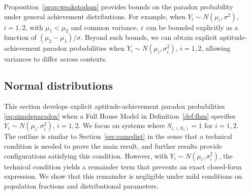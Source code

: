 \documentclass[12pt]{article}
\begin{document}
Proposition~\ref{prop:weakstodom} provides bounds on the paradox probability under general achievement distributions. For example, when $Y_i \sim N(\mu_i, \sigma^2)$, $i = 1,2$, with $\mu_1 < \mu_2$ and common variance, $\varepsilon$ can be bounded explicitly as a function of $(\mu_2 - \mu_1)/\sigma$. Beyond such bounds, we can obtain explicit aptitude-achievement paradox probabilities when $Y_i \sim N(\mu_i,\sigma_i^2)$, $i = 1,2$, allowing variances to differ across contexts.


\subsection{Normal distributions}
\label{subsec:normal}


This section develops explicit aptitude-achievement paradox probabilities \eqref{eq:simpleparadox} when a Full House Model in Definition~\ref{def:fhm} specifies $Y_i \sim N(\mu_i,\sigma_i^2)$, $i = 1,2$. We focus on systems where $S_{i,(N_i)} = 1$ for $i = 1,2$. The outline is similar to Section~\ref{sec:samedist} in the sense that a technical condition is needed to prove the main result, and further results provide configurations satisfying this condition. However, with $Y_i \sim N(\mu_i,\sigma_i^2)$, the technical condition yields a remainder term that prevents an exact closed-form expression. We show that this remainder is negligible under mild conditions on population fractions and distributional parameters.
\end{document}

